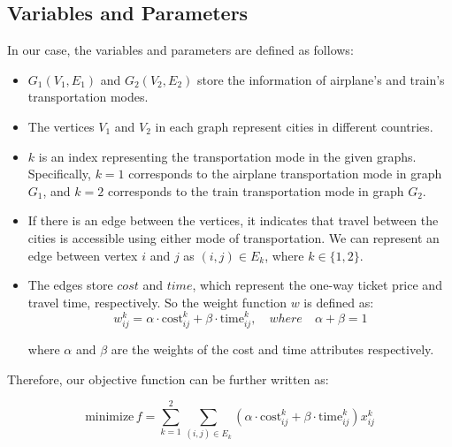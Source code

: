 \documentclass{article}
\begin{document}
\subsection*{Variables and Parameters}
In our case, the variables and parameters are defined as follows:
\begin{itemize}
  \item $G_1(V_1, E_1)$ and $G_2(V_2, E_2)$ store the information of airplane's and train's transportation modes.
  \item The vertices $V_1$ and $V_2$ in each graph represent cities in different
        countries.
  \item $k$ is an index representing the transportation mode in the given graphs. Specifically, $k = 1$ corresponds to the airplane transportation mode in graph $G_1$, and $k = 2$ corresponds to the train transportation mode in graph $G_2$.
  \item If there is an edge between the vertices, it indicates that travel between the
        cities is accessible using either mode of transportation. We can represent an
        edge between vertex $i$ and $j$ as $(i, j) \in E_k$, where $k \in \{1, 2\}$.
  \item The edges store $cost$ and $time$, which represent the one-way ticket price and
        travel time, respectively. So the weight function $w$ is defined as:
        \begin{equation*}
          w_{ij}^k = \alpha \cdot \text{cost}_{ij}^k + \beta \cdot \text{time}_{ij}^k, \quad where \quad \alpha + \beta = 1
        \end{equation*}

        where $\alpha$ and $\beta$ are the weights of the cost and time attributes
        respectively.

\end{itemize}
Therefore, our objective function can be further written as:

\begin{equation*}
  \text{minimize}\, f = \sum_{k=1}^{2} \sum_{(i,j) \in E_k} (\alpha \cdot \text{cost}_{ij}^k + \beta \cdot \text{time}_{ij}^k) x_{ij}^k
\end{equation*}
\end{document}
